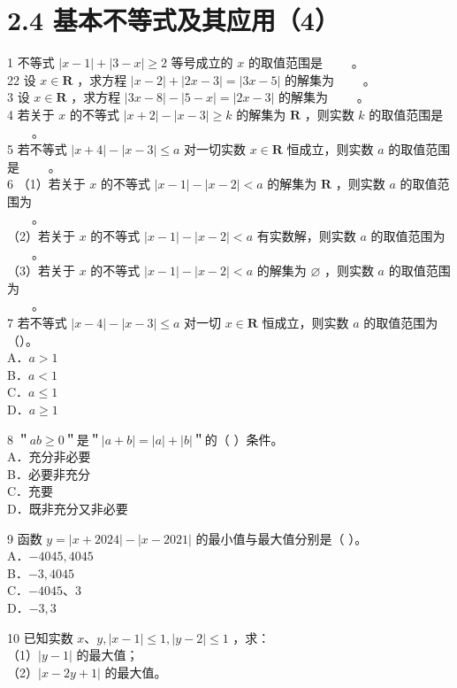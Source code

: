 \documentclass[10pt]{article}
\begin{document}
\section*{2.4 基本不等式及其应用（4）}
1 不等式 \(|x-1|+|3-x| \geqslant 2\) 等号成立的 \(x\) 的取值范围是 \(\qquad\)。\\
22 设 \(x \in \mathbf{R}\) ，求方程 \(|x-2|+|2 x-3|=|3 x-5|\) 的解集为 \(\qquad\)。\\
3 设 \(x \in \mathbf{R}\) ，求方程 \(|3 x-8|-|5-x|=|2 x-3|\) 的解集为 \(\qquad\)。\\
4 若关于 \(x\) 的不等式 \(|x+2|-|x-3| \geqslant k\) 的解集为 \(\mathbf{R}\) ，则实数 \(k\) 的取值范围是 \(\qquad\)。\\
5 若不等式 \(|x+4|-|x-3| \leqslant a\) 对一切实数 \(x \in \mathbf{R}\) 恒成立，则实数 \(a\) 的取值范围是 \(\qquad\)。\\
6 （1）若关于 \(x\) 的不等式 \(|x-1|-|x-2|<a\) 的解集为 \(\mathbf{R}\) ，则实数 \(a\) 的取值范围为\\
\(\qquad\)。\\
（2）若关于 \(x\) 的不等式 \(|x-1|-|x-2|<a\) 有实数解，则实数 \(a\) 的取值范围为\\
\(\qquad\)。\\
（3）若关于 \(x\) 的不等式 \(|x-1|-|x-2|<a\) 的解集为 \(\varnothing\) ，则实数 \(a\) 的取值范围为\\
\(\qquad\)。\\
7 若不等式 \(|x-4|-|x-3| \leqslant a\) 对一切 \(x \in \mathbf{R}\) 恒成立，则实数 \(a\) 的取值范围为（）。\\
A．\(a>1\)\\
B．\(a<1\)\\
C．\(a \leqslant 1\)\\
D．\(a \geqslant 1\)

8 ＂\(a b \geqslant 0\)＂是＂\(|a+b|=|a|+|b|\)＂的（ ）条件。\\
A．充分非必要\\
B．必要非充分\\
C．充要\\
D．既非充分又非必要

9 函数 \(y=|x+2024|-|x-2021|\) 的最小值与最大值分别是（ ）。\\
A．\(-4045,4045\)\\
B．\(-3,4045\)\\
C．\(-4045 、 3\)\\
D．\(-3,3\)

10 已知实数 \(x 、 y,|x-1| \leqslant 1,|y-2| \leqslant 1\) ，求：\\
（1）\(|y-1|\) 的最大值；\\
（2）\(|x-2 y+1|\) 的最大值。
\end{document}
